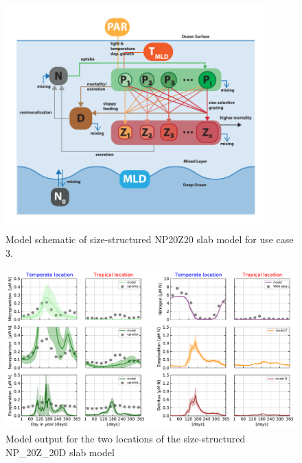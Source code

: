 \documentclass[journal abbreviation, manuscript]{copernicus}
\begin{document}
\begin{figure}[t]
\includegraphics[width=10cm]{Figures/firstdraft_schematics/03__schematics_SizeStructSlab.pdf}
\caption{Model schematic of size-structured NP20Z20 slab model for use case 3.}
\label{phydraschematics_3}
\end{figure}



\begin{figure}[t]
\includegraphics[width=12cm]{Figures/firstdraft_plots/04_sizestruct_slab.pdf}
\caption{Model output for the two locations of the size-structured NP_{20}Z_{20}D slab model}
\label{SizeStructuredSlab_results}
\end{figure}




\end{document}
